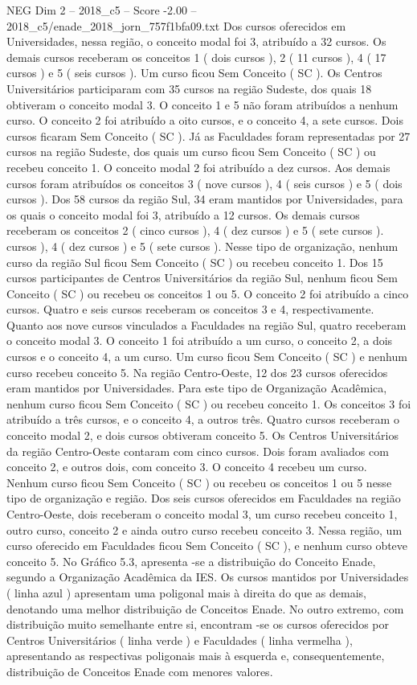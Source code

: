 \begin{textsample}{NEG Dim 2 – 2018\_c5 – Score -2.00 – 2018\_c5/enade\_2018\_jorn\_757f1bfa09.txt}
Dos cursos oferecidos em Universidades, nessa região, o conceito modal foi 3, atribuído a 32 cursos.
Os demais cursos receberam os conceitos 1 ( dois cursos ), 2 ( 11 cursos ), 4 ( 17 cursos ) e 5 ( seis cursos ).
Um curso ficou Sem Conceito ( SC ).
Os Centros Universitários participaram com 35 cursos na região Sudeste, dos quais 18 obtiveram o conceito modal 3.
O conceito 1 e 5 não foram atribuídos a nenhum curso.
O conceito 2 foi atribuído a oito cursos, e o conceito 4, a sete cursos.
Dois cursos ficaram Sem Conceito ( SC ).
Já as Faculdades foram representadas por 27 cursos na região Sudeste, dos quais um curso ficou Sem Conceito ( SC ) ou recebeu conceito 1.
O conceito modal 2 foi atribuído a dez cursos.
Aos demais cursos foram atribuídos os conceitos 3 ( nove cursos ), 4 ( seis cursos ) e 5 ( dois cursos ).
Dos 58 cursos da região Sul, 34 eram mantidos por Universidades, para os quais o conceito modal foi 3, atribuído a 12 cursos.
Os demais cursos receberam os conceitos 2 ( cinco cursos ), 4 ( dez cursos ) e 5 ( sete cursos ). cursos ), 4 ( dez cursos ) e 5 ( sete cursos ).
Nesse tipo de organização, nenhum curso da região Sul ficou Sem Conceito ( SC ) ou recebeu conceito 1.
Dos 15 cursos participantes de Centros Universitários da região Sul, nenhum ficou Sem Conceito ( SC ) ou recebeu os conceitos 1 ou 5.
O conceito 2 foi atribuído a cinco cursos.
Quatro e seis cursos receberam os conceitos 3 e 4, respectivamente.
Quanto aos nove cursos vinculados a Faculdades na região Sul, quatro receberam o conceito modal 3.
O conceito 1 foi atribuído a um curso, o conceito 2, a dois cursos e o conceito 4, a um curso.
Um curso ficou Sem Conceito ( SC ) e nenhum curso recebeu conceito 5.
Na região Centro-Oeste, 12 dos 23 cursos oferecidos eram mantidos por Universidades.
Para este tipo de Organização Acadêmica, nenhum curso ficou Sem Conceito ( SC ) ou recebeu conceito 1.
Os conceitos 3 foi atribuído a três cursos, e o conceito 4, a outros três.
Quatro cursos receberam o conceito modal 2, e dois cursos obtiveram conceito 5.
Os Centros Universitários da região Centro-Oeste contaram com cinco cursos.
Dois foram avaliados com conceito 2, e outros dois, com conceito 3.
O conceito 4 recebeu um curso.
Nenhum curso ficou Sem Conceito ( SC ) ou recebeu os conceitos 1 ou 5 nesse tipo de organização e região.
Dos seis cursos oferecidos em Faculdades na região Centro-Oeste, dois receberam o conceito modal 3, um curso recebeu conceito 1, outro curso, conceito 2 e ainda outro curso recebeu conceito 3.
Nessa região, um curso oferecido em Faculdades ficou Sem Conceito ( SC ), e nenhum curso obteve conceito 5.
No Gráfico 5.3, apresenta -se a distribuição do Conceito Enade, segundo a Organização Acadêmica da IES.
Os cursos mantidos por Universidades ( linha azul ) apresentam uma poligonal mais à direita do que as demais, denotando uma melhor distribuição de Conceitos Enade.
No outro extremo, com distribuição muito semelhante entre si, encontram -se os cursos oferecidos por Centros Universitários ( linha verde ) e Faculdades ( linha vermelha ), apresentando as respectivas poligonais mais à esquerda e, consequentemente, distribuição de Conceitos Enade com menores valores.

\end{textsample}
